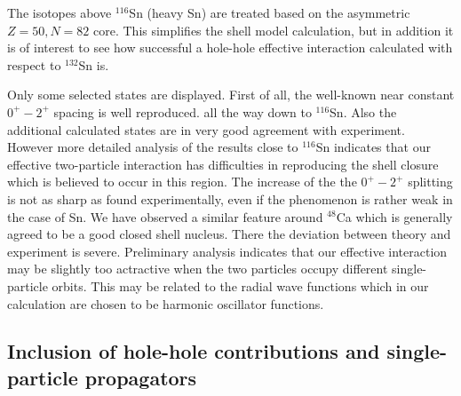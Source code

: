The isotopes above $^{116}$Sn (heavy Sn) are treated based 
on the asymmetric $Z = 50, N = 82$ core. 
This simplifies the shell model calculation,
but in addition it is of interest to see how successful a hole-hole effective 
interaction calculated with respect to $^{132}$Sn  is.

Only some selected states are displayed. First of all, the well-known 
near constant $0^{+} - 2^{+}$ spacing is well reproduced. 
all the way down to 
$^{116}$Sn.
Also the additional calculated states are in very good agreement
with experiment. However more detailed analysis of 
the results close to $^{116}$Sn
indicates that our effective two-particle interaction 
has difficulties in reproducing
the shell closure which is believed to occur in this region. 
The increase of the 
the $0^{+} - 2^{+}$ splitting is not as sharp as found 
experimentally, even if the 
phenomenon is rather weak in the case of Sn.
We have observed a similar feature around $^{48}$Ca \cite{hko95}
which is generally agreed
to be a good closed shell nucleus. There the deviation 
between theory and experiment 
is severe. Preliminary analysis indicates that our effective interaction
may be slightly too actractive when the two particles 
occupy different single-particle orbits.
This may be related to the radial wave functions which in our calculation are 
chosen to be harmonic oscillator functions.


\subsection{Inclusion of hole-hole contributions and 
single-particle propagators}

